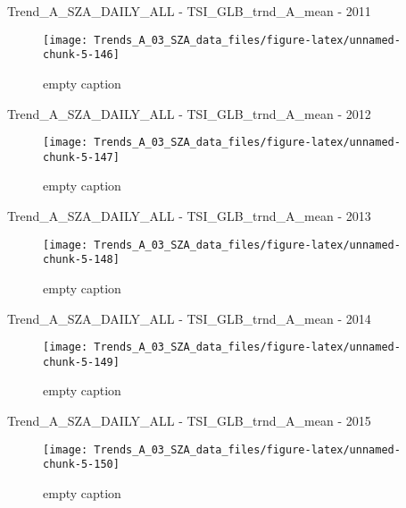 \documentclass[
  10pt,
  a4paper,oneside]{article}
\begin{document}
Trend\_A\_SZA\_DAILY\_ALL - TSI\_GLB\_trnd\_A\_mean - 2011

\begin{figure}[!ht]

{\centering \texttt{[image: Trends\_A\_03\_SZA\_data\_files/figure-latex/unnamed-chunk-5-146]} 

}

\caption{ empty caption }\label{fig:unnamed-chunk-5-146}
\end{figure}

Trend\_A\_SZA\_DAILY\_ALL - TSI\_GLB\_trnd\_A\_mean - 2012

\begin{figure}[!ht]

{\centering \texttt{[image: Trends\_A\_03\_SZA\_data\_files/figure-latex/unnamed-chunk-5-147]} 

}

\caption{ empty caption }\label{fig:unnamed-chunk-5-147}
\end{figure}

Trend\_A\_SZA\_DAILY\_ALL - TSI\_GLB\_trnd\_A\_mean - 2013

\begin{figure}[!ht]

{\centering \texttt{[image: Trends\_A\_03\_SZA\_data\_files/figure-latex/unnamed-chunk-5-148]} 

}

\caption{ empty caption }\label{fig:unnamed-chunk-5-148}
\end{figure}

Trend\_A\_SZA\_DAILY\_ALL - TSI\_GLB\_trnd\_A\_mean - 2014

\begin{figure}[!ht]

{\centering \texttt{[image: Trends\_A\_03\_SZA\_data\_files/figure-latex/unnamed-chunk-5-149]} 

}

\caption{ empty caption }\label{fig:unnamed-chunk-5-149}
\end{figure}

Trend\_A\_SZA\_DAILY\_ALL - TSI\_GLB\_trnd\_A\_mean - 2015

\begin{figure}[!ht]

{\centering \texttt{[image: Trends\_A\_03\_SZA\_data\_files/figure-latex/unnamed-chunk-5-150]} 

}

\caption{ empty caption }\label{fig:unnamed-chunk-5-150}
\end{figure}
\end{document}
